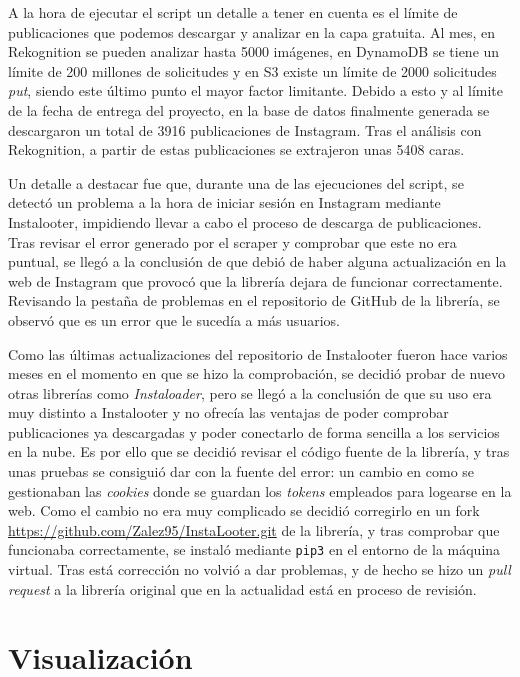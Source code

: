 A la hora de ejecutar el script un detalle a tener en cuenta es el límite de publicaciones que podemos descargar y analizar en la capa gratuita. Al mes, en Rekognition se pueden analizar hasta 5000 imágenes, en DynamoDB se tiene un límite de 200 millones de solicitudes y en S3 existe un límite de 2000 solicitudes \textit{put}, siendo este último punto el mayor factor limitante. Debido a esto y al límite de la fecha de entrega del proyecto, en la base de datos finalmente generada se descargaron un total de 3916 publicaciones de Instagram. Tras el análisis con Rekognition, a partir de estas publicaciones se extrajeron unas 5408 caras.

Un detalle a destacar fue que, durante una de las ejecuciones del script, se detectó un problema a la hora de iniciar sesión en Instagram mediante Instalooter, impidiendo llevar a cabo el proceso de descarga de publicaciones. Tras revisar el error generado por el scraper y comprobar que este no era puntual, se llegó a la conclusión de que debió de haber alguna actualización en la web de Instagram que provocó que la librería dejara de funcionar correctamente. Revisando la pestaña de problemas en el repositorio de GitHub de la librería, se observó que es un error que le sucedía a más usuarios.

Como las últimas actualizaciones del repositorio de Instalooter fueron hace varios meses en el momento en que se hizo la comprobación, se decidió probar de nuevo otras librerías como \textit{Instaloader}, pero se llegó a la conclusión de que su uso era muy distinto a Instalooter y no ofrecía las ventajas de poder comprobar publicaciones ya descargadas y poder conectarlo de forma sencilla a los servicios en la nube. Es por ello que se decidió revisar el código fuente de la librería, y tras unas pruebas se consiguió dar con la fuente del error: un cambio en como se gestionaban las \textit{cookies} donde se guardan los \textit{tokens} empleados para logearse en la web. Como el cambio no era muy complicado se decidió corregirlo en un fork \url{https://github.com/Zalez95/InstaLooter.git} de la librería, y tras comprobar que funcionaba correctamente, se instaló mediante \texttt{pip3} en el entorno de la máquina virtual. Tras está corrección no volvió a dar problemas, y de hecho se hizo un \textit{pull request} a la librería original que en la actualidad está en proceso de revisión.

\section{Visualización}
\label{sect:grafana_visualizacion}

